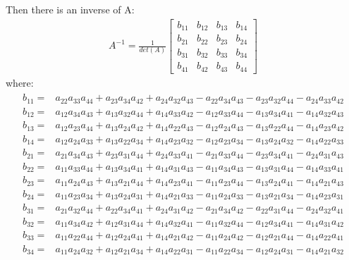 Then there is an inverse of A:
\begin{gather}
A^{-1} = \frac{1}{det(A)}
\begin{bmatrix}
b_{11}&b_{12}&b_{13}&b_{14}\\
b_{21}&b_{22}&b_{23}&b_{24}\\
b_{31}&b_{32}&b_{33}&b_{34}\\
b_{41}&b_{42}&b_{43}&b_{44}
\end{bmatrix}
\end{gather}
where:
\begin{align}
	\begin{split}
		b_{11}=&a_{22}a_{33}a_{44}+a_{23}a_{34}a_{42}+a_{24}a_{32}a_{43}-a_{22}a_{34}a_{43}-a_{23}a_{32}a_{44}-a_{24}a_{33}a_{42} \\
		b_{12}=&a_{12}a_{34}a_{43}+a_{13}a_{32}a_{44}+a_{14}a_{33}a_{42}-a_{12}a_{33}a_{44}-a_{13}a_{34}a_{41}-a_{14}a_{32}a_{43} \\
		b_{13}=&a_{12}a_{23}a_{44}+a_{13}a_{24}a_{42}+a_{14}a_{22}a_{43}-a_{12}a_{24}a_{43}-a_{13}a_{22}a_{44}-a_{14}a_{23}a_{42} \\
		b_{14}=&a_{12}a_{24}a_{33}+a_{13}a_{22}a_{34}+a_{14}a_{23}a_{32}-a_{12}a_{23}a_{34}-a_{13}a_{24}a_{32}-a_{14}a_{22}a_{33} \\[1ex]
		b_{21}=&a_{21}a_{34}a_{43}+a_{23}a_{31}a_{44}+a_{24}a_{33}a_{41}-a_{21}a_{33}a_{44}-a_{23}a_{34}a_{41}-a_{24}a_{31}a_{43} \\
		b_{22}=&a_{11}a_{33}a_{44}+a_{13}a_{34}a_{41}+a_{14}a_{31}a_{43}-a_{11}a_{34}a_{43}-a_{13}a_{31}a_{44}-a_{14}a_{33}a_{41} \\
		b_{23}=&a_{11}a_{24}a_{43}+a_{13}a_{21}a_{44}+a_{14}a_{23}a_{41}-a_{11}a_{23}a_{44}-a_{13}a_{24}a_{41}-a_{14}a_{21}a_{43} \\
		b_{24}=&a_{11}a_{23}a_{34}+a_{13}a_{24}a_{31}+a_{14}a_{21}a_{33}-a_{11}a_{24}a_{33}-a_{13}a_{21}a_{34}-a_{14}a_{23}a_{31} \\[1ex]
		b_{31}=&a_{21}a_{32}a_{44}+a_{22}a_{34}a_{41}+a_{24}a_{31}a_{42}-a_{21}a_{34}a_{42}-a_{22}a_{31}a_{44}-a_{24}a_{32}a_{41} \\
		b_{32}=&a_{11}a_{34}a_{42}+a_{12}a_{31}a_{44}+a_{14}a_{32}a_{41}-a_{11}a_{32}a_{44}-a_{12}a_{34}a_{41}-a_{14}a_{31}a_{42} \\
		b_{33}=&a_{11}a_{22}a_{44}+a_{12}a_{24}a_{41}+a_{14}a_{21}a_{42}-a_{11}a_{24}a_{42}-a_{12}a_{21}a_{44}-a_{14}a_{22}a_{41} \\
		b_{34}=&a_{11}a_{24}a_{32}+a_{12}a_{21}a_{34}+a_{14}a_{22}a_{31}-a_{11}a_{22}a_{34}-a_{12}a_{24}a_{31}-a_{14}a_{21}a_{32} \\[1ex]

\end{split}
\end{align}
